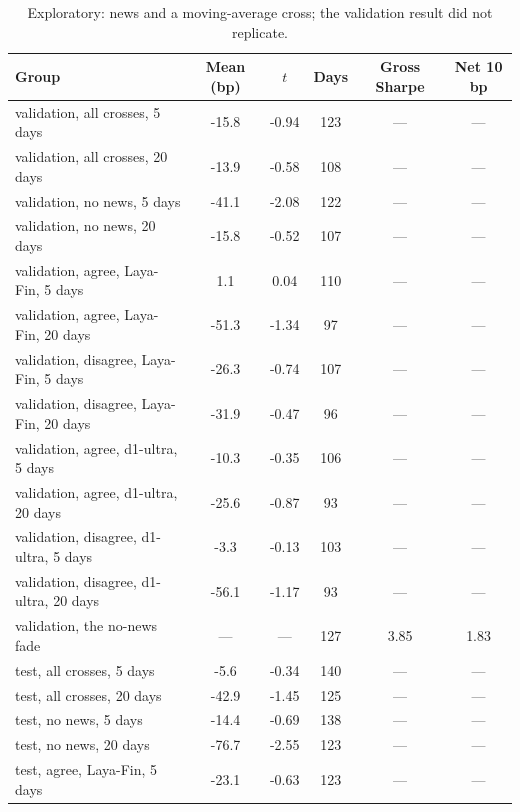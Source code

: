 \begin{table}[htbp]
\centering
\small
\begin{threeparttable}
\caption{Exploratory: news and a moving-average cross; the validation result did not replicate.}\label{tab:a-ma-cross}
\begin{tabular}{@{}lS[table-format=-3.1]S[table-format=-1.2]S[table-format=3.0]S[table-format=1.2]S[table-format=-1.2]@{}}
\toprule
Group & {Mean (bp)} & {$t$} & {Days} & {Gross Sharpe} & {Net 10 bp} \\
\midrule
validation, all crosses, 5 days & -15.8 & -0.94 & 123 & {---} & {---} \\
validation, all crosses, 20 days & -13.9 & -0.58 & 108 & {---} & {---} \\
validation, no news, 5 days & -41.1 & -2.08 & 122 & {---} & {---} \\
validation, no news, 20 days & -15.8 & -0.52 & 107 & {---} & {---} \\
validation, agree, Laya-Fin, 5 days & 1.1 & 0.04 & 110 & {---} & {---} \\
validation, agree, Laya-Fin, 20 days & -51.3 & -1.34 & 97 & {---} & {---} \\
validation, disagree, Laya-Fin, 5 days & -26.3 & -0.74 & 107 & {---} & {---} \\
validation, disagree, Laya-Fin, 20 days & -31.9 & -0.47 & 96 & {---} & {---} \\
validation, agree, d1-ultra, 5 days & -10.3 & -0.35 & 106 & {---} & {---} \\
validation, agree, d1-ultra, 20 days & -25.6 & -0.87 & 93 & {---} & {---} \\
validation, disagree, d1-ultra, 5 days & -3.3 & -0.13 & 103 & {---} & {---} \\
validation, disagree, d1-ultra, 20 days & -56.1 & -1.17 & 93 & {---} & {---} \\
validation, the no-news fade & {---} & {---} & 127 & 3.85 & 1.83 \\
test, all crosses, 5 days & -5.6 & -0.34 & 140 & {---} & {---} \\
test, all crosses, 20 days & -42.9 & -1.45 & 125 & {---} & {---} \\
test, no news, 5 days & -14.4 & -0.69 & 138 & {---} & {---} \\
test, no news, 20 days & -76.7 & -2.55 & 123 & {---} & {---} \\
test, agree, Laya-Fin, 5 days & -23.1 & -0.63 & 123 & {---} & {---} \\

\end{tabular}
\end{threeparttable}
\end{table}

